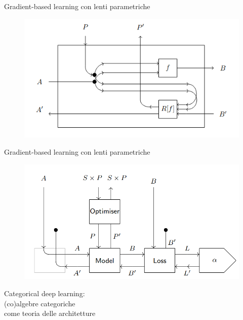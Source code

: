 \documentclass{beamer}
\begin{document}
\begin{frame}{Gradient-based learning con lenti parametriche}
    \begin{figure}
        \begin{center}
            \includegraphics[width=\textwidth]{figures/parametric_lens.png}
            \caption*{\cite{cruttwell2022categorical}}
        \end{center}
    \end{figure}
\end{frame}

\begin{frame}{Gradient-based learning con lenti parametriche}
    \begin{figure}
        \begin{center}
            \includegraphics[width=\textwidth]{figures/lenses_supervised_learning2.png}
            \caption*{\cite{cruttwell2022categorical}}
        \end{center}
    \end{figure}
\end{frame}

\begin{frame}[standout]
    \huge Categorical deep learning: \\\large (co)algebre categoriche \\come teoria delle architetture
\end{frame}
\end{document}
